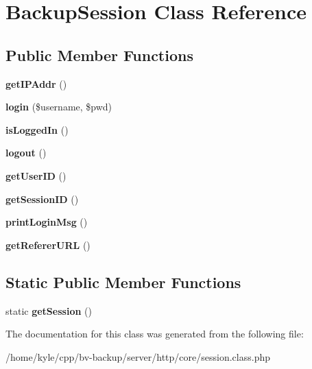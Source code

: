 \hypertarget{class_backup_session}{}\section{Backup\+Session Class Reference}
\label{class_backup_session}
\subsection*{Public Member Functions}
\begin{DoxyCompactItemize}
\item 
\mbox{\label{class_backup_session_acc6683cf8d786e59ec0eb13074d5d5b3}} 
{\bfseries get\+I\+P\+Addr} ()
\item 
\mbox{\label{class_backup_session_a7e66f81601af667694b0dcac50a23bd4}} 
{\bfseries login} (\$username, \$pwd)
\item 
\mbox{\label{class_backup_session_af2a67ef17feca4126fde4608942e876a}} 
{\bfseries is\+Logged\+In} ()
\item 
\mbox{\label{class_backup_session_a9cb794c8f32a359f938a10b994a3fdda}} 
{\bfseries logout} ()
\item 
\mbox{\label{class_backup_session_a150334dceffd7e3ae15988d4446651c8}} 
{\bfseries get\+User\+ID} ()
\item 
\mbox{\label{class_backup_session_af197e1253feabe45999efbae44c86625}} 
{\bfseries get\+Session\+ID} ()
\item 
\mbox{\label{class_backup_session_a49f3431e36ecc6c77e6384519bdf91d3}} 
{\bfseries print\+Login\+Msg} ()
\item 
\mbox{\label{class_backup_session_a1dde966fbace7c52d63c6e0d4da42bcf}} 
{\bfseries get\+Referer\+U\+RL} ()
\end{DoxyCompactItemize}
\subsection*{Static Public Member Functions}
\begin{DoxyCompactItemize}
\item 
\mbox{\label{class_backup_session_ade409e52ef17402c176b492d2d580079}} 
static {\bfseries get\+Session} ()
\end{DoxyCompactItemize}


The documentation for this class was generated from the following file\+:\begin{DoxyCompactItemize}
\item 
/home/kyle/cpp/bv-\/backup/server/http/core/session.\+class.\+php\end{DoxyCompactItemize}
